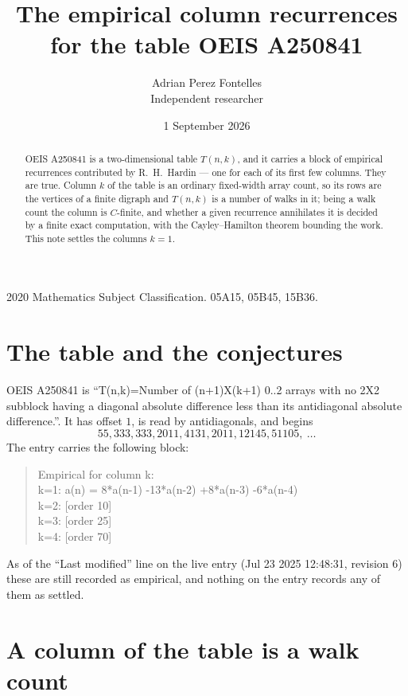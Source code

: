 \documentclass[11pt,a4paper]{article}
\title{The empirical column recurrences for the table OEIS A250841}
\author{Adrian Perez Fontelles\\ \small Independent researcher}
\date{1 September 2026}
\theoremstyle{plain}
\theoremstyle{definition}
\begin{document}
\maketitle

\begin{abstract}
OEIS A250841 is a two-dimensional table $T(n,k)$, and it carries a block of empirical
recurrences contributed by R.~H.~Hardin --- one for each of its first few columns. They are
true. Column $k$ of the table is an ordinary fixed-width array count, so its rows are the
vertices of a finite digraph and $T(n,k)$ is a number of walks in it; being a walk count the
column is $C$-finite, and whether a given recurrence annihilates it is decided by a finite
exact computation, with the Cayley--Hamilton theorem bounding the work. This note settles the
columns $k=1$.
\end{abstract}

\noindent\small 2020 Mathematics Subject Classification. 05A15, 05B45, 15B36.\normalsize

\section{The table and the conjectures}

OEIS A250841 is ``T(n,k)=Number of (n+1)X(k+1) 0..2 arrays with no 2X2 subblock having a diagonal absolute difference less than its antidiagonal absolute difference.''. It has offset $1$, is
read by antidiagonals, and begins
\[
55, 333, 333, 2011, 4131, 2011, 12145, 51105,\ \dots
\]
The entry carries the following block:
\begin{quote}\small
Empirical for column k:\\
k=1: a(n) = 8*a(n-1) -13*a(n-2) +8*a(n-3) -6*a(n-4)\\
k=2: [order 10]\\
k=3: [order 25]\\
k=4: [order 70]\\
\end{quote}
As of the ``Last modified'' line on the live entry (Jul 23 2025 12:48:31, revision 6) these are still
recorded as empirical, and nothing on the entry records any of them as settled.

\section{A column of the table is a walk count}
\end{document}
